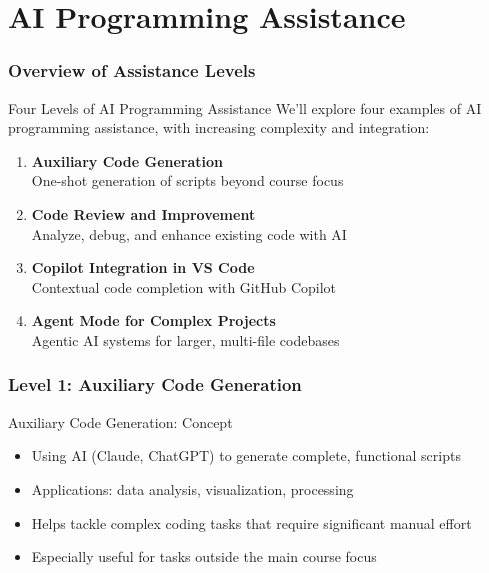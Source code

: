 \documentclass[xcolor=dvipsnames, aspectratio=169]{beamer}
\begin{document}
\part[AI Programming Assistance]{AI Programming Assistance}
\section{Overview of Assistance Levels}

\begin{frame}{Four Levels of AI Programming Assistance}
  We'll explore four examples of AI programming assistance, with increasing complexity and integration:
  
  \begin{enumerate}
    \item \textbf{Auxiliary Code Generation}\\
    One-shot generation of scripts beyond course focus
    
    \item \textbf{Code Review and Improvement}\\
    Analyze, debug, and enhance existing code with AI
    
    \item \textbf{Copilot Integration in VS Code}\\
    Contextual code completion with GitHub Copilot
    
    \item \textbf{Agent Mode for Complex Projects}\\
    Agentic AI systems for larger, multi-file codebases
  \end{enumerate}
\end{frame}

\section{Level 1: Auxiliary Code Generation}

\begin{frame}{Auxiliary Code Generation: Concept}
  \begin{itemize}
    \item Using AI (Claude, ChatGPT) to generate complete, functional scripts
    \item Applications: data analysis, visualization, processing
    \item Helps tackle complex coding tasks that require significant manual effort
    \item Especially useful for tasks outside the main course focus
  \end{itemize}
\end{frame}
\end{document}
